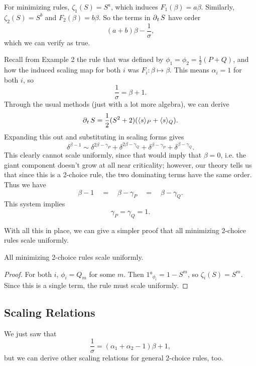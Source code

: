 \documentclass[twoside,10pt]{article}
\begin{document}
\begin{ex}
	For minimizing rules, $\zeta_1(S) = S^{a}$, which induces $F_1(\beta) = a\beta$. Similarly, $\zeta_2(S) = S^{b}$ and $F_2(\beta) = b\beta$. So the terms in $\operatorname{\partial}_{t}{S} $ have order
	\[
		(a+b)\beta - \frac{1}{\sigma} ,
	\] which we can verify as true.
\end{ex}

\begin{ex}
	Recall from Example 2 the rule that was defined by $\phi_1 = \phi_2 = \frac{1}{2} (P+Q)$, and how the induced scaling map for both $i$ was $F_i:\beta\mapsto \beta$. This means $\alpha_i=1$ for both $i$, so
	\[
	\frac{1}{\sigma} = \beta+1.
	\] Through the usual methods (just with a lot more algebra), we can derive
	\[
		\operatorname{\partial}_{t}{S} = \frac{1}{2} (S^2+2)(\langle s \rangle_{P}+\langle s \rangle_{Q}).
	\]
	Expanding this out and substituting in scaling forms gives
	\[
		\delta^{\beta-1} \sim \delta^{2\beta-\gamma_{P}}+\delta^{2\beta-\gamma_{Q}}+\delta^{\beta-\gamma_{P}}+\delta^{\beta-\gamma_{Q}}.
	\] This clearly cannot scale uniformly, since that would imply that $\beta=0$, i.e. the giant component doesn't grow at all near criticality; however, our theory tells us that since this is a 2-choice rule, the two dominating terms have the same order. Thus we have
	\[
	\beta -1 \quad=\quad \beta-\gamma_{P} \quad=\quad \beta-\gamma_{Q}.
\] This system implies
	\[
	\gamma_{P}=\gamma_{Q}=1.
	\]
\end{ex}

With all this in place, we can give a simpler proof that all minimizing 2-choice rules scale uniformly.
\begin{prop}
All minimizing 2-choice rules scale uniformly.
\end{prop}
\begin{proof}
	For both $i$, $\phi_i = Q_m$ for some $m$. Then $\ang{1}_{\phi_i} = 1 - S^{m}$, so $\zeta_i(S) = S^{m}$. Since this is a single term, the rule must scale uniformly.
\end{proof}

\subsection{Scaling Relations}

We just saw that
\begin{equation}
	\frac{1}{\sigma} = (\alpha_1+\alpha_2-1)\beta+1,
\end{equation}
but we can derive other scaling relations for general 2-choice rules, too.
\end{document}

